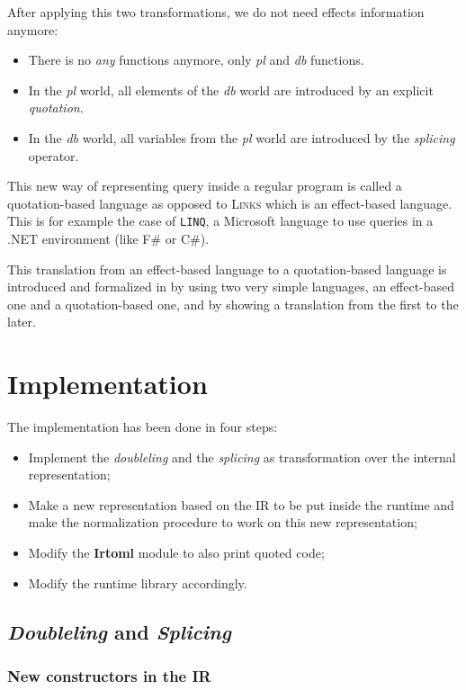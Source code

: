 \documentclass[11pt]{article}
\newcommand\mysc[1]{{\rmfamily\textsc{#1}}\xspace}
\newcommand\links{\mysc{Links}}
\newcommand\effect[1]{{\em #1}}
\newcommand\module[1]{{\bf #1}}
\begin{document}
After applying this two transformations, we do not need effects information anymore:
\begin{itemize}
\item There is no \effect{any} functions anymore, only \effect{pl} and \effect{db} functions.
\item In the \effect{pl} world, all elements of the \effect{db} world are introduced by an explicit \emph{quotation}.
\item In the \effect{db} world, all variables from the \effect{pl} world are introduced by the \emph{splicing} operator.
\end{itemize}

This new way of representing query inside a regular program is called a quotation-based language as opposed to \links which is an effect-based language. 
This is for example the case of {\tt LINQ}, a Microsoft language to use queries in a .NET environment (like F\# or C\#). 

This translation from an effect-based language to a quotation-based language is introduced and formalized in \cite{links:querycomp} by using two very simple languages, an effect-based one and a quotation-based one, and by showing a translation from the first to the later.

\section{Implementation}

The implementation has been done in four steps:
\begin{itemize}
\item Implement the \emph{doubleling} and the \emph{splicing} as transformation over the internal representation;
\item Make a new representation based on the IR to be put inside the runtime and make the normalization procedure to work on this new representation;
\item Modify the \module{Irtoml} module to also print quoted code;
\item Modify the runtime library accordingly. 
\end{itemize}

\subsection{\emph{Doubleling} and \emph{Splicing}}

\subsubsection{New constructors in the IR}
\end{document}

